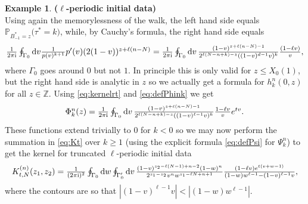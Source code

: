 \documentclass[letterpaper,reqno,11pt,oneside,final]{amsart}
\theoremstyle{definition}
\newtheorem{ex}[thm]{Example}
\newcommand{\I}{\uptext{i}}
\newcommand{\pp}{\mathbb{P}}
\newcommand{\zz}{\mathbb{Z}}
\newcommand{\inv}[1]{\frac{1}{#1}}
\newcommand{\uptext}[1]{\text{\upshape{#1}}}
\renewcommand{\d}{\mathrm{d}}
\numberwithin{equation}{section}
\begin{document}
\begin{ex}{\bf ($\bm{\ell}$-periodic initial data)}
\begin{equation}
\end{equation}
Using again the memorylessness of the walk, the left hand side equals $\pp_{B^*_{-1}=z}\big(\tau^* = k\big)$, while, by Cauchy's formula, the right hand side equals
\[\textstyle\inv{2\pi\I}\oint_{\Gamma_{0}} \d v\frac{1}{p(v)^{k+1}} p'(v) (2(1-v))^{z + \ell(n-N)}
=\frac{1}{2 \pi \I} \oint_{\Gamma_{0}} \d v\, \frac{(1-v)^{z + \ell(n-N) - 1}}{2^{\ell(N-n+k)-z} ((1-v)^{d-1} v)^{k}}\frac{(1 - \ell v)}{v},\]
where $\Gamma_0$ goes around $0$ but not $1$.
In principle this is only valid for $z\leq X_0(1)$, but the right hand side is analytic in $z$ so we actually get a formula for $h^n_k(0,z)$ for all $z\in\zz$.
Using \eqref{eq:kernelrt} and \eqref{eq:defPhink} we get
\begin{equation}
\textstyle\Phi^n_k(z) = \frac{1}{2 \pi \I} \oint_{\Gamma_{0}} \d v\, \frac{(1-v)^{z + \ell (n-N) - 1}}{2^{\ell (N-n+k)-z}((1-v)^{\ell -1} v)^{k}}\frac{1-\ell v}{v} e^{tv}.
\end{equation}
These functions extend trivially to 0 for $k<0$ so we may now perform the summation in \eqref{eq:Kt} over $k \geq 1$ (using the explicit formula \eqref{eq:defPsi} for $\Psi^n_k$) to get the kernel for truncated $\ell$-periodic initial data
\begin{equation}
\textstyle K^{(n)}_{t,N}(z_1,z_2) = \frac{1}{(2\pi\I)^2} \oint_{\Gamma_{0}} \d w \oint_{\Gamma_{0}'} \d v\, \frac{(1-v)^{z_2 - \ell (N-1) + n - 2} (1-w)^{n}}{2^{z_1 - z_2} v^n w^{z_1 -\ell N + n+1}} \frac{(1 - \ell v) e^{t(v + w - 1)}}{(1-w) w^{\ell -1} - (1-v)^{\ell -1} v},
\end{equation}
where the contours are so that $|(1-v)^{\ell -1}v|<|(1-w)w^{\ell -1}|$.


\end{ex}
\end{document}
